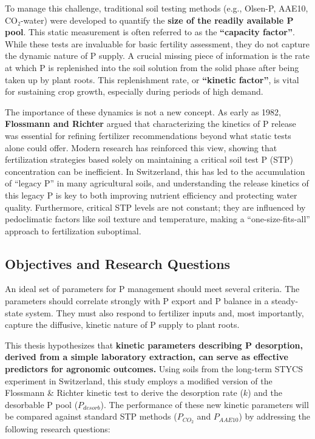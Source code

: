 \documentclass[
  a4paper,
]{article}
\begin{document}
To manage this challenge, traditional soil testing methods (e.g.,
Olsen-P, AAE10, CO₂-water) were developed to quantify the \textbf{size
of the readily available P pool}. This static measurement is often
referred to as the \textbf{``capacity factor''}. While these tests are
invaluable for basic fertility assessment, they do not capture the
dynamic nature of P supply. A crucial missing piece of information is
the rate at which P is replenished into the soil solution from the solid
phase after being taken up by plant roots. This replenishment rate, or
\textbf{``kinetic factor''}, is vital for sustaining crop growth,
especially during periods of high demand.

The importance of these dynamics is not a new concept. As early as 1982,
\textbf{Flossmann and Richter} argued that characterizing the kinetics
of P release was essential for refining fertilizer recommendations
beyond what static tests alone could offer. Modern research has
reinforced this view, showing that fertilization strategies based solely
on maintaining a critical soil test P (STP) concentration can be
inefficient. In Switzerland, this has led to the accumulation of
``legacy P'' in many agricultural soils, and understanding the release
kinetics of this legacy P is key to both improving nutrient efficiency
and protecting water quality. Furthermore, critical STP levels are not
constant; they are influenced by pedoclimatic factors like soil texture
and temperature, making a ``one-size-fits-all'' approach to
fertilization suboptimal.

\subsection{Objectives and Research
Questions}\label{objectives-and-research-questions}

An ideal set of parameters for P management should meet several
criteria. The parameters should correlate strongly with P export and P
balance in a steady-state system. They must also respond to fertilizer
inputs and, most importantly, capture the diffusive, kinetic nature of P
supply to plant roots.

This thesis hypothesizes that \textbf{kinetic parameters describing P
desorption, derived from a simple laboratory extraction, can serve as
effective predictors for agronomic outcomes.} Using soils from the
long-term STYCS experiment in Switzerland, this study employs a modified
version of the Flossmann \& Richter kinetic test to derive the
desorption rate (\(k\)) and the desorbable P pool (\(P_{desorb}\)). The
performance of these new kinetic parameters will be compared against
standard STP methods (\(P_{CO_2}\) and \(P_{AAE10}\)) by addressing the
following research questions:
\end{document}
